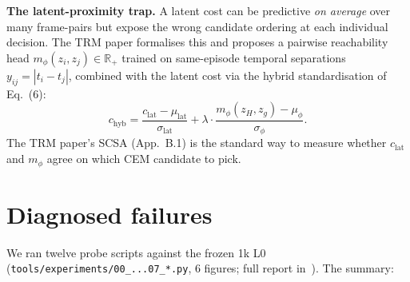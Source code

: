 \documentclass[11pt]{article}
\begin{document}
\textbf{The latent-proximity trap.}
A latent cost can be predictive \emph{on average} over many
frame-pairs but expose the wrong candidate ordering at each
individual decision. The TRM paper formalises this and proposes a
pairwise reachability head
$m_\phi(z_i, z_j) \in \mathbb R_+$ trained on same-episode temporal
separations $y_{ij} = |t_i - t_j|$, combined with the latent cost
via the hybrid standardisation of Eq.~(6):
\begin{equation}
c_{\mathrm{hyb}}
  = \frac{c_{\mathrm{lat}} - \mu_{\mathrm{lat}}}{\sigma_{\mathrm{lat}}}
  + \lambda \cdot \frac{m_\phi(z_H, z_g) - \mu_\phi}{\sigma_\phi}.
  \label{eq:hybrid}
\end{equation}
The TRM paper's SCSA (App.~B.1) is the standard way to measure
whether $c_{\mathrm{lat}}$ and $m_\phi$ agree on which CEM
candidate to pick.

\section{Diagnosed failures}
\label{sec:failures}

We ran twelve probe scripts against the frozen 1k L0
(\texttt{tools/experiments/00\_...07\_*.py}, 6 figures; full
report in~\cite{wally:report}). The summary:
\end{document}
